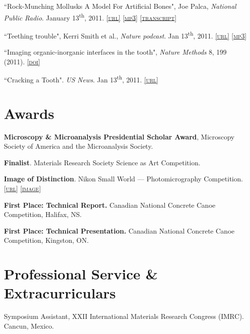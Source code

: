``Rock-Munching Mollusks A Model For Artificial Bones", Joe Palca, \emph{National Public Radio}. January 13\textsuperscript{th}, 2011. \href{http://www.npr.org/2011/01/13/132859853/rock-munching-mollusks-a-model-for-artificial-bones}{\textsc{\footnotesize{[url]}}} \href{http://lylegordon.ca/audio/npr-2011-01-13.mp3}{\textsc{\footnotesize{[mp3]}}}  \href{http://lylegordon.ca/nprtranscript.html}{\textsc{\footnotesize{[transcript]}}}

``Teething trouble", Kerri Smith et al., \emph{Nature podcast}. Jan 13\textsuperscript{th}, 2011. \href{http://www.nature.com/nature/podcast/index-2011-01-13.html}{\textsc{\footnotesize{[url]}}} \href{http://lylegordon.ca/audio/nature-2011-01-13.mp3}{\textsc{\footnotesize{[mp3]}}}

``Imaging organic-inorganic interfaces in the tooth", \emph{Nature Methods} 8, 199 (2011). \href{http://dx.doi.org/10.1038/nmeth0311-199}{\textsc{\footnotesize{[doi]}}}

 ``Cracking a Tooth". \emph{US News}. Jan 13\textsuperscript{th}, 2011. \href{http://www.usnews.com/science/articles/2011/01/13/cracking-a-tooth}{\textsc{\footnotesize{[url]}}}
\endgroup

\section*{Awards}
\textbf{Microscopy \& Microanalysis Presidential Scholar Award}, Microscopy Society of America and the Microanalysis Society.

\begingroup\setlength{\parskip}{0.1cm}
\textbf{Finalist}. Materials Research Society Science as Art Competition.

\textbf{Image of Distinction}. Nikon Small World --- Photomicrography Competition. \href{http://www.nikonsmallworld.com/detail/year/2009/66}{\textsc{\footnotesize{[url]}}} \href{http://lylegordon.ca/nikon2009.jpg}{\textsc{\footnotesize{[image]}}}

\textbf{First Place: Technical Report.} Canadian National Concrete Canoe Competition, Halifax, NS.

\textbf{First Place: Technical Presentation.} Canadian National Concrete Canoe Competition, Kingston, ON.
\endgroup

\section*{Professional Service \& Extracurriculars}
Symposium Assistant, XXII International Materials Research Congress (IMRC). Cancun, Mexico.

